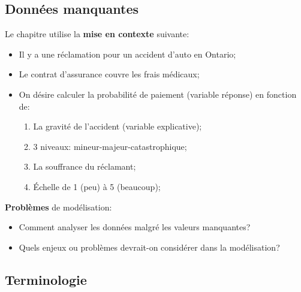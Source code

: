 \documentclass[10pt, french]{article}
\begin{document}
\begin{multicols*}{3}
\newpage

\section{Données manquantes}

Le chapitre utilise la \textbf{mise en contexte} suivante:
\begin{itemize}[leftmargin = *]
	\item	Il y a une réclamation pour un accident d'auto en Ontario;
	\item	Le contrat d'assurance couvre les frais médicaux;
	\item	On désire calculer la probabilité de paiement (variable réponse) en fonction de:
		\begin{enumerate}[leftmargin = *]
		\item	La gravité de l'accident (variable explicative);
		\item[]	3 niveaux: mineur-majeur-catastrophique;
		\item	La souffrance du réclamant;
		\item[]	Échelle de 1 (peu) à 5 (beaucoup);
		\end{enumerate}
\end{itemize}

\textbf{Problèmes} de modélisation:
\begin{itemize}[leftmargin = *]
	\item	Comment analyser les données malgré les valeurs manquantes?
	\item	Quels enjeux ou problèmes devrait-on considérer dans la modélisation?
\end{itemize}

\subsection*{Terminologie}


\end{multicols*}
\end{document}
